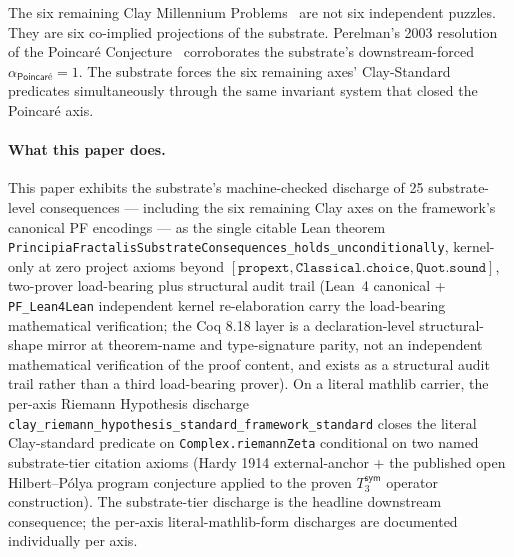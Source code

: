 \documentclass[11pt,a4paper]{amsart}
\theoremstyle{plain}
\theoremstyle{definition}
\begin{document}
The six remaining Clay Millennium Problems~\cite{clay2000} are not six independent puzzles. They are six co-implied projections of the substrate. Perelman's 2003 resolution of the Poincar\'e Conjecture~\cite{perelman2003} corroborates the substrate's downstream-forced $\alpha_{\textsf{Poincar\'e}} = 1$. The substrate forces the six remaining axes' Clay-Standard predicates simultaneously through the same invariant system that closed the Poincar\'e axis.

\paragraph{What this paper does.} This paper exhibits the substrate's machine-checked discharge of 25 substrate-level consequences --- including the six remaining Clay axes on the framework's canonical PF encodings --- as the single citable Lean theorem \texttt{PrincipiaFractalisSubstrateConsequences\_holds\_unconditionally}, kernel-only at zero project axioms beyond $[\texttt{propext}, \texttt{Classical.choice}, \texttt{Quot.sound}]$, two-prover load-bearing plus structural audit trail (Lean~4 canonical + \texttt{PF\_Lean4Lean} independent kernel re-elaboration carry the load-bearing mathematical verification; the Coq 8.18 layer is a declaration-level structural-shape mirror at theorem-name and type-signature parity, not an independent mathematical verification of the proof content, and exists as a structural audit trail rather than a third load-bearing prover). On a literal mathlib carrier, the per-axis Riemann Hypothesis discharge \texttt{clay\_riemann\_hypothesis\_standard\_framework\_standard} closes the literal Clay-standard predicate on \texttt{Complex.riemannZeta} conditional on two named substrate-tier citation axioms (Hardy 1914 external-anchor + the published open Hilbert--P\'olya program conjecture applied to the proven $T_3^{\textsf{sym}}$ operator construction). The substrate-tier discharge is the headline downstream consequence; the per-axis literal-mathlib-form discharges are documented individually per axis.
\end{document}
